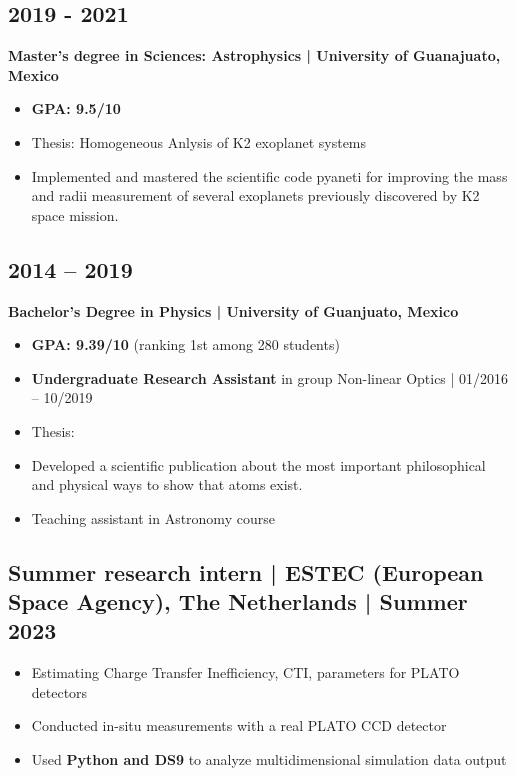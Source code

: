 \documentclass[11pt,a4paper]{article}
\begin{document}
\begin{multicols}{2}
		\subsection{2019 - 2021}
		\textbf{Master's degree in Sciences: Astrophysics | University of Guanajuato, Mexico}
		\begin{itemize}
		\item \textbf{GPA: 9.5/10}
		\item Thesis: Homogeneous Anlysis of K2 exoplanet systems
		\item Implemented and mastered the scientific code pyaneti for improving the mass and radii measurement of several exoplanets previously discovered by K2 space mission. 
		\end{itemize}
		
		\subsection{2014 – 2019}
		\textbf{Bachelor's Degree in Physics | University of Guanjuato, Mexico}
		\begin{itemize}
			\item \textbf{GPA: 9.39/10} (ranking 1st among 280 students)
			\item \textbf{Undergraduate Research Assistant} in group Non-linear Optics | 01/2016 – 10/2019
			\item Thesis: 
			\item Developed a scientific publication about the most important philosophical and physical ways to show that atoms exist. 
			\item Teaching assistant in Astronomy course
		\end{itemize}
		
		\subsection{ Summer research intern | ESTEC (European Space Agency), The Netherlands | Summer 2023}
		\begin{itemize}
			\item Estimating Charge Transfer Inefficiency, CTI, parameters for PLATO detectors
			\item Conducted in-situ measurements with a real PLATO CCD detector
			\item Used \textbf{Python and DS9} to analyze multidimensional simulation data output
		\end{itemize}
		
	\end{multicols}
	
\end{document}
